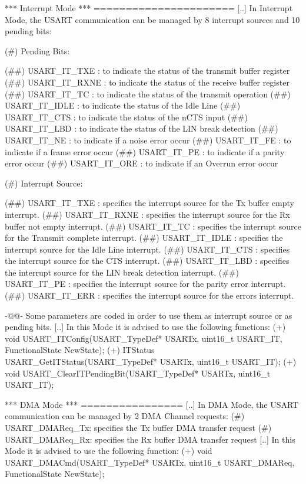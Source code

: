 \begin{DoxyVerb}
    *** Interrupt Mode ***
    ======================
    [..]
    In Interrupt Mode, the USART communication can be managed by 8 interrupt sources
    and 10 pending bits: 

      (#) Pending Bits:

        (##) USART_IT_TXE : to indicate the status of the transmit buffer register
        (##) USART_IT_RXNE : to indicate the status of the receive buffer register
        (##) USART_IT_TC : to indicate the status of the transmit operation
        (##) USART_IT_IDLE : to indicate the status of the Idle Line             
        (##) USART_IT_CTS : to indicate the status of the nCTS input
        (##) USART_IT_LBD : to indicate the status of the LIN break detection
        (##) USART_IT_NE : to indicate if a noise error occur
        (##) USART_IT_FE : to indicate if a frame error occur
        (##) USART_IT_PE : to indicate if a parity error occur
        (##) USART_IT_ORE : to indicate if an Overrun error occur

      (#) Interrupt Source:

        (##) USART_IT_TXE : specifies the interrupt source for the Tx buffer empty 
                            interrupt. 
        (##) USART_IT_RXNE : specifies the interrupt source for the Rx buffer not 
                             empty interrupt.
        (##) USART_IT_TC : specifies the interrupt source for the Transmit complete 
                           interrupt. 
        (##) USART_IT_IDLE : specifies the interrupt source for the Idle Line interrupt.             
        (##) USART_IT_CTS : specifies the interrupt source for the CTS interrupt. 
        (##) USART_IT_LBD : specifies the interrupt source for the LIN break detection
                            interrupt. 
        (##) USART_IT_PE : specifies the interrupt source for the parity error interrupt. 
        (##) USART_IT_ERR :  specifies the interrupt source for the errors interrupt.

      -@@- Some parameters are coded in order to use them as interrupt source 
          or as pending bits.
    [..]
    In this Mode it is advised to use the following functions:
      (+) void USART_ITConfig(USART_TypeDef* USARTx, uint16_t USART_IT, FunctionalState NewState);
      (+) ITStatus USART_GetITStatus(USART_TypeDef* USARTx, uint16_t USART_IT);
      (+) void USART_ClearITPendingBit(USART_TypeDef* USARTx, uint16_t USART_IT);

    *** DMA Mode ***
    ================
    [..]
    In DMA Mode, the USART communication can be managed by 2 DMA Channel requests:
      (#) USART_DMAReq_Tx: specifies the Tx buffer DMA transfer request
      (#) USART_DMAReq_Rx: specifies the Rx buffer DMA transfer request
    [..]
    In this Mode it is advised to use the following function:
      (+) void USART_DMACmd(USART_TypeDef* USARTx, uint16_t USART_DMAReq, FunctionalState NewState);\end{DoxyVerb}
 

